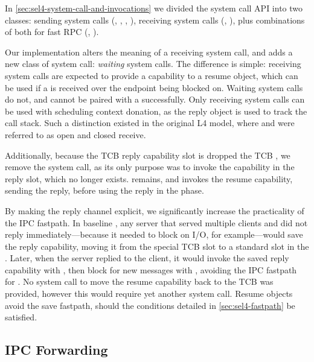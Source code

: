 In \cref{sec:sel4-system-call-and-invocations} we divided the \selfour system call API into two
classes: sending system calls (\send, \nbsend, \call, \reply),
receiving system calls (\recv, \nbrecv), plus combinations of both for fast 
RPC (\call, \replyrecv).  

Our implementation alters the meaning of a receiving system call, and adds a new class of system
call: \emph{waiting} system calls. The difference is simple: receiving system calls are expected to
provide a capability to a resume object, which can be used if a \call is received over
the endpoint being blocked on. Waiting system calls do not, and cannot be paired with a \call
successfully. Only receiving system calls can be used with scheduling context donation, as the reply
object is used to track the call stack. Such a distinction existed in the original L4 model, where
and were referred to as open and closed receive.

Additionally, because the TCB reply capability slot is dropped the \gls{TCB} \cnode, we remove the \reply 
system call, as its only purpose was to invoke the capability in the reply slot, which no longer exists.
\replyrecv remains, and invokes the resume capability, sending the reply, before using the
reply in the \recv phase. 

By making the reply channel explicit, we significantly increase the practicality of the IPC
fastpath. In baseline \selfour, any server that served multiple clients and did not reply
immediately---because it needed to block on I/O, for example---would save the reply
capability, moving it from the special TCB slot to a standard slot in the \cspace. Later, when
the server replied to the client, it would invoke the saved reply capability with \send, then block
for new messages with \recv, avoiding the IPC fastpath for \replyrecv. No system call to move the 
resume capability back to the \gls{TCB} \cnode was provided, however this would require yet another
system call. Resume objects avoid the save
fastpath, should the conditions detailed in \cref{sec:sel4-fastpath} be satisfied.

\subsection{IPC Forwarding}
\label{s:ipc-forwarding}

